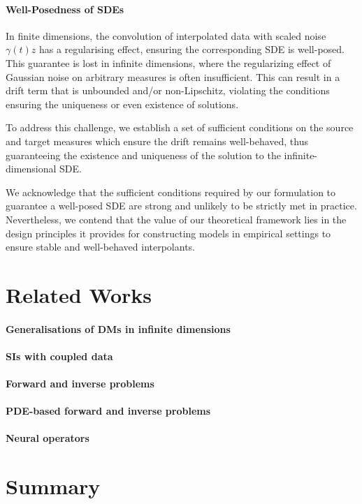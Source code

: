 \paragraph{Well-Posedness of SDEs} In finite dimensions, the convolution of interpolated data with scaled noise \(\gamma(t)z\) has a regularising effect, ensuring the corresponding SDE is well-posed. This guarantee is lost in infinite dimensions, where the regularizing effect of Gaussian noise on arbitrary measures is often insufficient. This can result in a drift term that is unbounded and/or non-Lipschitz, violating the conditions ensuring the uniqueness or even existence of solutions.

To address this challenge, we establish a set of sufficient conditions on the source and target measures which ensure the drift remains well-behaved, thus guaranteeing the existence and uniqueness of the solution to the infinite-dimensional SDE.

We acknowledge that the sufficient conditions required by our formulation to guarantee a well-posed SDE are strong and unlikely to be strictly met in practice. Nevertheless, we contend that the value of our theoretical framework lies in the design principles it provides for constructing models in empirical settings to ensure stable and well-behaved interpolants.

\section{Related Works}

\paragraph{Generalisations of DMs in infinite dimensions}

\paragraph{SIs with coupled data}
\paragraph{Forward and inverse problems}

\paragraph{PDE-based forward and inverse problems}

\paragraph{Neural operators}


\section{Summary}